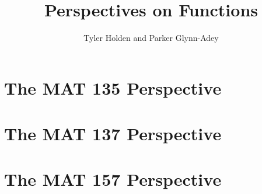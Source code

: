 \documentclass[aspectratio=169]{beamer}
\title{Perspectives on Functions}
\author{Tyler Holden and Parker Glynn-Adey}
\begin{document}
\begin{frame}
	\maketitle
\end{frame}

\section{The MAT 135 Perspective}
\section{The MAT 137 Perspective}
\section{The MAT 157 Perspective}
	
\end{document}
